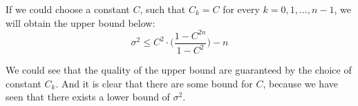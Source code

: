 \documentclass[a4paper,10pt]{article}
\begin{document}
If we could choose a constant $C$, such that $C_k = C$ for every $k = 0,1,\dots,n-1$, we will obtain the upper bound below:
$$\sigma^2 \leq C^2 \cdot \Bigg( \frac{1 - C^{2n} }{1 - C^2}\Bigg) - n$$

We could see that the quality of the upper bound are guaranteed by the choice of constant $C_k$. And it is clear that there are some bound for $C$, because we have seen that there exists a lower bound of $\sigma^2$.










\end{document}
